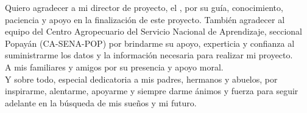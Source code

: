 
Quiero agradecer a mi director de proyecto, el \director, por su guía, conocimiento, paciencia  y apoyo en la finalización de este proyecto. También agradecer al  equipo del Centro Agropecuario del Servicio Nacional de Aprendizaje, seccional Popayán (CA-SENA-POP) por brindarme su apoyo, experticia y confianza al suministrarme los datos y la información necesaria para realizar mi proyecto.\\

A mis familiares y amigos por su presencia y apoyo moral.\\ 

Y sobre todo, especial dedicatoria a mis padres, hermanos y abuelos, por inspirarme, alentarme, apoyarme y siempre darme ánimos y fuerza para seguir adelante en la búsqueda de mis sueños y mi futuro.\\


